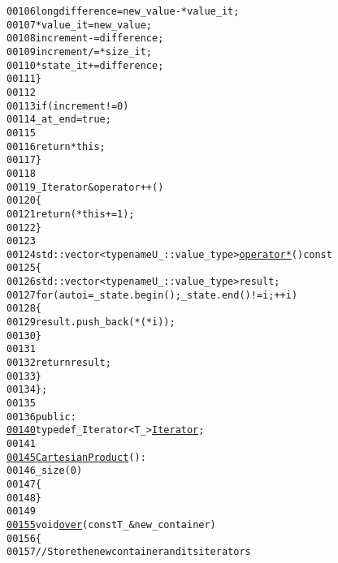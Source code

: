 \begin{footnotesize}
\begin{alltt}
00106                             \textcolor{keywordtype}{long} difference = new\_value - *value\_it;
00107                             *value\_it = new\_value;
00108                             increment -= difference;
00109                             increment /= *size\_it;
00110                             *state\_it += difference;
00111                         \}
00112 
00113                         \textcolor{keywordflow}{if} (increment != 0)
00114                             \_at\_end = \textcolor{keyword}{true};
00115 
00116                         \textcolor{keywordflow}{return} *\textcolor{keyword}{this};
00117                     \}
00118 
00119                     \_Iterator & operator++ ()
00120                     \{
00121                         \textcolor{keywordflow}{return} (*\textcolor{keyword}{this} += 1);
00122                     \}
00123 
00124                     std::vector<typename U\_::value\_type> \hyperlink{namespaceeos_a6025a42d446265afd81f6c749999a391}{operator* }()\textcolor{keyword}{ const}
00125 \textcolor{keyword}{                    }\{
00126                         std::vector<typename U\_::value\_type> result;
00127                         \textcolor{keywordflow}{for} (\textcolor{keyword}{auto} i = \_state.begin() ; \_state.end() != i ; ++i)
00128                         \{
00129                             result.push\_back(*(*i));
00130                         \}
00131 
00132                         \textcolor{keywordflow}{return} result;
00133                     \}
00134             \};
00135 
00136         \textcolor{keyword}{public}:
\hypertarget{cartesian-product_8hh_source_l00140}{}\hyperlink{classeos_1_1CartesianProduct_aa2ff28e4a1845a8ee763a877a8cd4346}{00140}             \textcolor{keyword}{typedef} \_Iterator<T\_> \hyperlink{classeos_1_1CartesianProduct_aa2ff28e4a1845a8ee763a877a8cd4346}{Iterator};
00141 
\hypertarget{cartesian-product_8hh_source_l00145}{}\hyperlink{classeos_1_1CartesianProduct_ab31950cf7edf8589a6e86a81b36d9b4d}{00145}             \hyperlink{classeos_1_1CartesianProduct_ab31950cf7edf8589a6e86a81b36d9b4d}{CartesianProduct}() :
00146                 \_size(0)
00147             \{
00148             \}
00149 
\hypertarget{cartesian-product_8hh_source_l00155}{}\hyperlink{classeos_1_1CartesianProduct_adef1565dbec35aab631423ade5b1baf0}{00155}             \textcolor{keywordtype}{void} \hyperlink{classeos_1_1CartesianProduct_adef1565dbec35aab631423ade5b1baf0}{over}(\textcolor{keyword}{const} T\_ & new\_container)
00156             \{
00157                 \textcolor{comment}{// Store the new container and its iterators}

\end{alltt}
\end{footnotesize}
